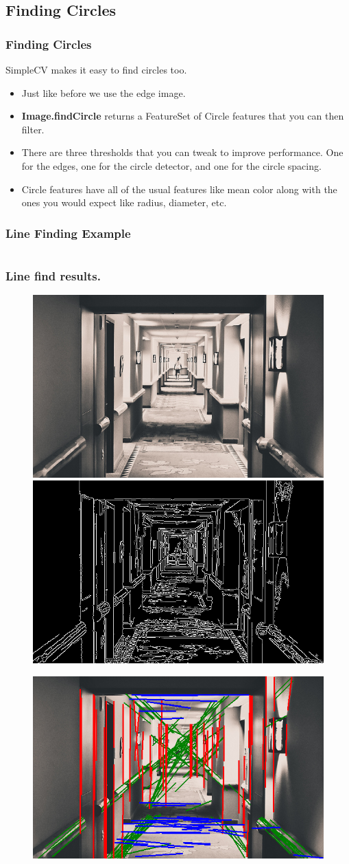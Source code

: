 \documentclass{beamer}
\begin{document}
\subsection{Finding Circles}
\begin{frame}
  \frametitle{Finding Circles}
SimpleCV makes it easy to find circles too.
\begin{itemize}
\item Just like before we use the edge image. 
\item \textbf{Image.findCircle} returns a FeatureSet of Circle features
  that you can then filter.
\item There are three thresholds that you can tweak to improve
  performance. One for the edges, one for the circle detector, and one
  for the circle spacing.
\item  Circle features have all of the usual features like mean color
  along with the ones you would expect like radius, diameter, etc. 
\end{itemize}
\end{frame}
\begin{frame}[fragile] 
\frametitle{Line Finding Example}
\begin{example}
\begin{verbatim}

\end{verbatim}
\end{example}
\end{frame} 
\begin{frame}
\frametitle{Line find results.}
 \begin{figure}
     \includegraphics[width=0.4\linewidth]{hallway.jpg}
     \quad
     \includegraphics[width=0.4\linewidth]{hallwayedges.png}
 \end{figure}
 \begin{figure}
     \includegraphics[width=0.4\linewidth]{hallwaylines.png}
 \end{figure}
\end{frame}
\end{document}
